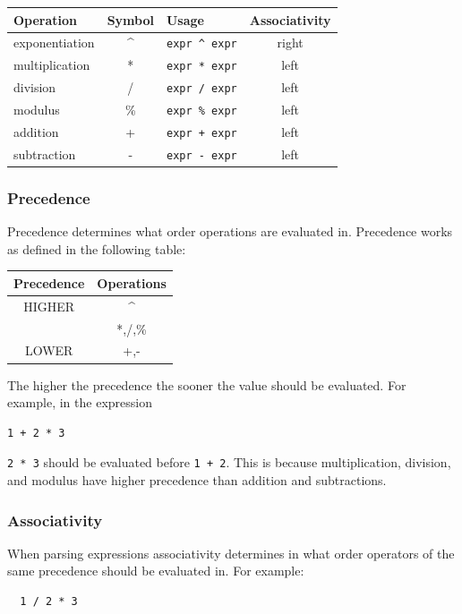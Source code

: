 \documentclass{article}
\newcommand{\code}[1]{\texttt{\textmd{#1}}}
\begin{document}
\begin{center}
  \begin{tabular}{|l|c|l|c|}
    \hline
    \textbf{Operation} & \textbf{Symbol} & \textbf{Usage} &
    \textbf{Associativity} \\
    \hline
    exponentiation & \textasciicircum & \code{expr \textasciicircum\ expr} & right\\
    multiplication & *  & \code{expr * expr}  & left \\
    division       & /  & \code{expr / expr}  & left \\
    modulus        & \% & \code{expr \% expr}  & left \\
    addition       & +  & \code{expr + expr}  & left \\
    subtraction    & -  & \code{expr - expr}  & left \\
    \hline
  \end{tabular}
\end{center}

\subsubsection{Precedence}
Precedence determines what order operations are evaluated in. Precedence works as defined in the following
table:

\begin{center}
  \begin{tabular}{|c|c|}
    \hline
    \textbf{Precedence} & \textbf{Operations} \\
    \hline
    HIGHER & \textasciicircum \\
           & *,/,\% \\
    LOWER  & +,- \\
    \hline
  \end{tabular}
\end{center}

The higher the precedence the sooner the value should be evaluated. For example, in the expression
\begin{lstlisting}
1 + 2 * 3
\end{lstlisting}
\code{2 * 3} should be evaluated before \code{1 + 2}. This is because multiplication, division, and modulus
have higher precedence than addition and subtractions.

\subsubsection{Associativity}
When parsing expressions associativity determines in what order operators of the same precedence
should be evaluated in. For example:
\begin{lstlisting}
  1 / 2 * 3
\end{lstlisting}
\end{document}
